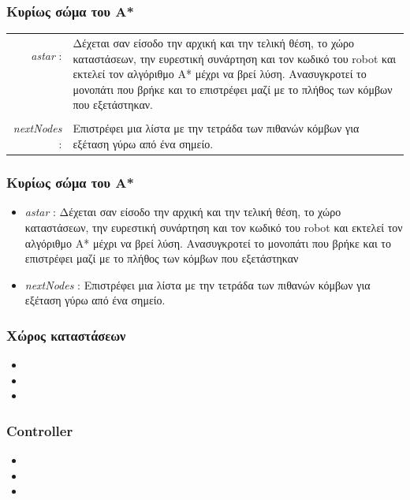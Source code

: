 \documentclass[a4paper,9pt]{article}
\begin{document}
\subsubsection{Κυρίως σώμα του Α*}
\begin{tabular}{r l}
    \emph{astar} :&\multirow{5}{10cm}{Δέχεται σαν είσοδο την αρχική και την τελική θέση, το χώρο
        καταστάσεων, την ευρεστική συνάρτηση και τον κωδικό του robot και εκτελεί
        τον αλγόριθμο Α* μέχρι να βρεί λύση. Ανασυγκροτεί το μονοπάτι που βρήκε
    και το επιστρέφει μαζί με το πλήθος των κόμβων που εξετάστηκαν.}\\
    &\\&\\&\\&\\&\\
    \emph{nextNodes} :&\multirow{2}{10cm}{Επιστρέφει μια λίστα με την τετράδα των πιθανών
    κόμβων για εξέταση γύρω από ένα σημείο.}\\
\end{tabular}
\subsubsection{Κυρίως σώμα του Α*}
\begin{itemize}
    \item \emph{astar} : Δέχεται σαν είσοδο την αρχική και την τελική θέση, το χώρο
        καταστάσεων, την ευρεστική συνάρτηση και τον κωδικό του robot και εκτελεί
        τον αλγόριθμο Α* μέχρι να βρεί λύση. Ανασυγκροτεί το μονοπάτι που βρήκε
        και το επιστρέφει μαζί με το πλήθος των κόμβων που εξετάστηκαν
    \item \emph{nextNodes} : Επιστρέφει μια λίστα με την τετράδα των πιθανών
        κόμβων για εξέταση γύρω από ένα σημείο.
\end{itemize}
\subsubsection{Χώρος καταστάσεων}
\begin{itemize}
    \item
    \item
    \item
\end{itemize}
\subsubsection{Controller}
\begin{itemize}
    \item
    \item
    \item
\end{itemize}
\end{document}

